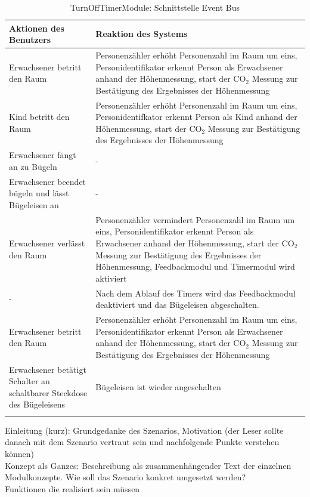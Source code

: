 \begin{longtabu} to 
	\hline
	\textbf{Aktionen des Benutzers}									& \textbf{Reaktion des Systems} \\
	\hline
	\endhead
	Erwachsener betritt den Raum	& Personenzähler erhöht Personenzahl im Raum um eins, Personidentifikator erkennt Person als Erwachsener anhand der Höhenmessung, start der CO$_2$ Messung zur Bestätigung des Ergebnisses der Höhenmessung \\ 
	\hline
	Kind betritt den Raum	& Personenzähler erhöht Personenzahl im Raum um eins, Personidentifkator erkennt Person als Kind anhand der Höhenmessung, start der CO$_2$ Messung zur Bestätigung des Ergebnisses der Höhenmessung \\
	\hline
	Erwachsener fängt an zu Bügeln	& - \\
	\hline
	Erwachsener beendet bügeln und lässt Bügeleisen an	& - \\
	\hline
	Erwachsener verlässt den Raum	& Personenzähler vermindert Personenzahl im Raum um eins, Personidentifikator erkennt Person als Erwachsener anhand der Höhenmessung, start der CO$_2$ Messung zur Bestätigung des Ergebnisses der Höhenmessung, Feedbackmodul und Timermodul wird aktiviert \\
	\hline
	-	& Nach dem Ablauf des Timers wird das Feedbackmodul deaktiviert und das Bügeleisen abgeschalten. \\
	\hline
	Erwachsener betritt den Raum	& Personenzähler erhöht Personenzahl im Raum um eins, Personidentifikator erkennt Person als Erwachsener anhand der Höhenmessung, start der CO$_2$ Messung zur Bestätigung des Ergebnisses der Höhenmessung \\
	\hline
	Erwachsener betätigt Schalter an schaltbarer Steckdose des Bügeleisens 	& Bügeleisen ist wieder angeschalten \\
	\hline
	\caption{TurnOffTimerModule: Schnittstelle Event Bus}
\end{longtabu}


Einleitung (kurz): Grundgedanke des Szenarios, Motivation (der Leser sollte danach mit dem Szenario vertraut sein und nachfolgende Punkte verstehen können)\\

Konzept als Ganzes: Beschreibung als zusammenhängender Text der einzelnen Modulkonzepte. Wie soll das Szenario konkret umgesetzt werden?\\

Funktionen die realisiert sein müssen\\

